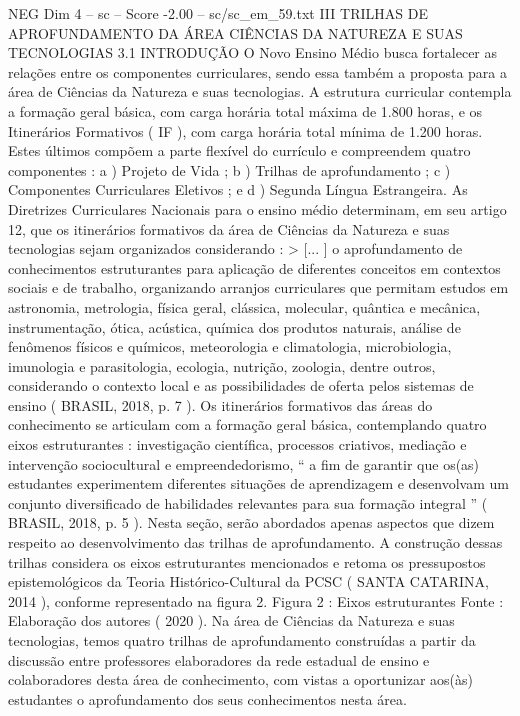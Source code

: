 \begin{textsample}{NEG Dim 4 – sc – Score -2.00 – sc/sc\_em\_59.txt}  \label{ex:f4_neg_258}
III TRILHAS DE APROFUNDAMENTO DA ÁREA CIÊNCIAS DA NATUREZA E SUAS TECNOLOGIAS 3.1 INTRODUÇÃO O Novo Ensino Médio busca fortalecer as relações entre os componentes curriculares, sendo essa também a proposta para a área de Ciências da Natureza e suas tecnologias.
A estrutura curricular contempla a formação geral básica, com carga horária total máxima de 1.800 horas, e os Itinerários Formativos ( IF ), com carga horária total mínima de 1.200 horas.
Estes últimos compõem a parte flexível do currículo e compreendem quatro componentes : a ) Projeto de Vida ; b ) Trilhas de aprofundamento ; c ) Componentes Curriculares Eletivos ; e d ) Segunda Língua Estrangeira.
As Diretrizes Curriculares Nacionais para o ensino médio determinam, em seu artigo 12, que os itinerários formativos da área de Ciências da Natureza e suas tecnologias sejam organizados considerando : > [... ] o aprofundamento de conhecimentos estruturantes para aplicação de diferentes conceitos em contextos sociais e de trabalho, organizando arranjos curriculares que permitam estudos em astronomia, metrologia, física geral, clássica, molecular, quântica e mecânica, instrumentação, ótica, acústica, química dos produtos naturais, análise de fenômenos físicos e químicos, meteorologia e climatologia, microbiologia, imunologia e parasitologia, ecologia, nutrição, zoologia, dentre outros, considerando o contexto local e as possibilidades de oferta pelos sistemas de ensino ( BRASIL, 2018, p. 7 ).
Os itinerários formativos das áreas do conhecimento se articulam com a formação geral básica, contemplando quatro eixos estruturantes : investigação científica, processos criativos, mediação e intervenção sociocultural e empreendedorismo, “ a fim de garantir que os(as) estudantes experimentem diferentes situações de aprendizagem e desenvolvam um conjunto diversificado de habilidades relevantes para sua formação integral ” ( BRASIL, 2018, p. 5 ).
Nesta seção, serão abordados apenas aspectos que dizem respeito ao desenvolvimento das trilhas de aprofundamento.
A construção dessas trilhas considera os eixos estruturantes mencionados e retoma os pressupostos epistemológicos da Teoria Histórico-Cultural da PCSC ( SANTA CATARINA, 2014 ), conforme representado na figura 2.
Figura 2 : Eixos estruturantes Fonte : Elaboração dos autores ( 2020 ).
Na área de Ciências da Natureza e suas tecnologias, temos quatro trilhas de aprofundamento construídas a partir da discussão entre professores elaboradores da rede estadual de ensino e colaboradores desta área de conhecimento, com vistas a oportunizar aos(às) estudantes o aprofundamento dos seus conhecimentos nesta área.

\end{textsample}
